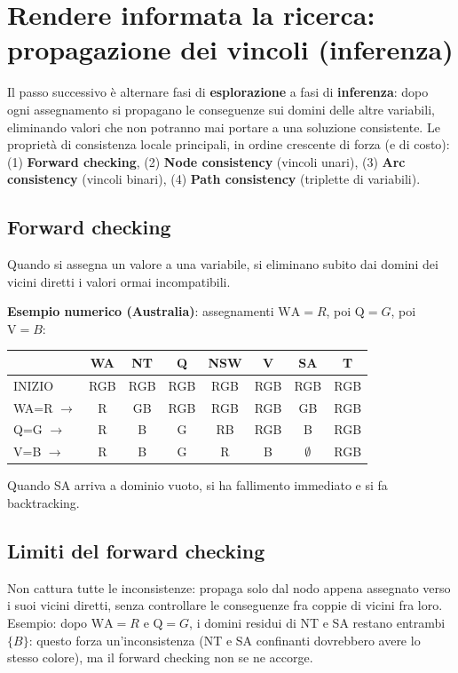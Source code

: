 \documentclass[11pt,a4paper]{report}
\begin{document}
\section{Rendere informata la ricerca: propagazione dei vincoli (inferenza)}

Il passo successivo è alternare fasi di \textbf{esplorazione} a fasi di \textbf{inferenza}: dopo ogni assegnamento si propagano le conseguenze sui domini delle altre variabili, eliminando valori che non potranno mai portare a una soluzione consistente. Le proprietà di consistenza locale principali, in ordine crescente di forza (e di costo): (1) \textbf{Forward checking}, (2) \textbf{Node consistency} (vincoli unari), (3) \textbf{Arc consistency} (vincoli binari), (4) \textbf{Path consistency} (triplette di variabili).

\subsection*{Forward checking}

Quando si assegna un valore a una variabile, si eliminano subito dai domini dei vicini diretti i valori ormai incompatibili.

\textbf{Esempio numerico (Australia)}: assegnamenti $\text{WA}{=}R$, poi $\text{Q}{=}G$, poi $\text{V}{=}B$:

\begin{center}
\small
\begin{tabular}{@{}lccccccc@{}}
\toprule
 & WA & NT & Q & NSW & V & SA & T \\
\midrule
INIZIO & RGB & RGB & RGB & RGB & RGB & RGB & RGB \\
WA=R $\to$ & R & GB & RGB & RGB & RGB & GB & RGB \\
Q=G $\to$ & R & B & G & RB & RGB & B & RGB \\
V=B $\to$ & R & B & G & R & B & $\emptyset$ & RGB \\
\bottomrule
\end{tabular}
\normalsize
\end{center}

Quando SA arriva a dominio vuoto, si ha fallimento immediato e si fa backtracking.

\subsection*{Limiti del forward checking}

Non cattura tutte le inconsistenze: propaga solo dal nodo appena assegnato verso i suoi vicini diretti, senza controllare le conseguenze fra coppie di vicini fra loro. Esempio: dopo $\text{WA}{=}R$ e $\text{Q}{=}G$, i domini residui di NT e SA restano entrambi $\{B\}$: questo forza un'inconsistenza (NT e SA confinanti dovrebbero avere lo stesso colore), ma il forward checking non se ne accorge.
\end{document}
